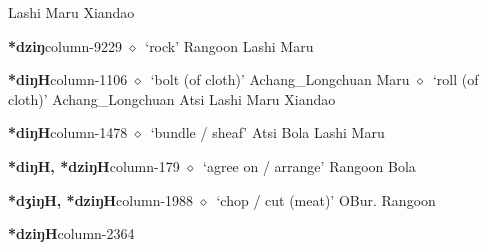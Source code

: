 \hspace{1ex}
         Lashi 
\hspace{1ex}
         Maru 
\hspace{1ex}
         Xiandao 
  \item {\footnotesize \textbf{*dziŋ}}{\tiny column-9229}
         $\diamond$~`rock'
         Rangoon 
\hspace{1ex}
         Lashi 
\hspace{1ex}
         Maru 
  \item {\footnotesize \textbf{*diŋH}}{\tiny column-1106}
         $\diamond$~`bolt (of cloth)'
         Achang\_Longchuan 
\hspace{1ex}
         Maru 
\hspace{1ex}
         $\diamond$~`roll (of cloth)'
         Achang\_Longchuan 
\hspace{1ex}
         Atsi 
\hspace{1ex}
         Lashi 
\hspace{1ex}
         Maru 
\hspace{1ex}
         Xiandao 
  \item {\footnotesize \textbf{*diŋH}}{\tiny column-1478}
         $\diamond$~`bundle / sheaf'
         Atsi 
\hspace{1ex}
         Bola 
\hspace{1ex}
         Lashi 
\hspace{1ex}
         Maru 
  \item {\footnotesize \textbf{*diŋH, *dziŋH}}{\tiny column-179}
         $\diamond$~`agree on / arrange'
         Rangoon 
\hspace{1ex}
         Bola 
  \item {\footnotesize \textbf{*dʒiŋH, *dziŋH}}{\tiny column-1988}
         $\diamond$~`chop / cut (meat)'
         OBur. 
\hspace{1ex}
         Rangoon 
  \item {\footnotesize \textbf{*dziŋH}}{\tiny column-2364}
